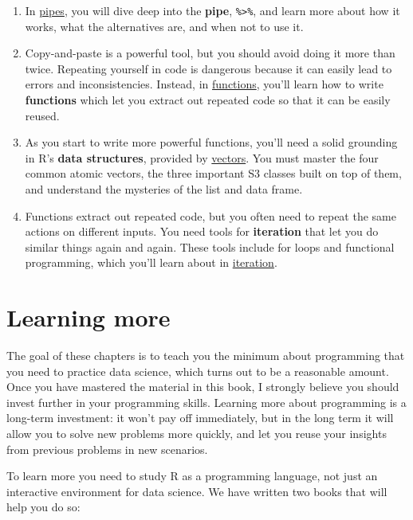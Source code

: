 \documentclass[]{book}
\begin{document}
\begin{enumerate}
\def\labelenumi{\arabic{enumi}.}
\item
  In \protect\hyperlink{pipes}{pipes}, you will dive deep into the
  \textbf{pipe}, \texttt{\%\textgreater{}\%}, and learn more about how
  it works, what the alternatives are, and when not to use it.
\item
  Copy-and-paste is a powerful tool, but you should avoid doing it more
  than twice. Repeating yourself in code is dangerous because it can
  easily lead to errors and inconsistencies. Instead, in
  \protect\hyperlink{functions}{functions}, you'll learn how to write
  \textbf{functions} which let you extract out repeated code so that it
  can be easily reused.
\item
  As you start to write more powerful functions, you'll need a solid
  grounding in R's \textbf{data structures}, provided by
  \protect\hyperlink{vectors}{vectors}. You must master the four common
  atomic vectors, the three important S3 classes built on top of them,
  and understand the mysteries of the list and data frame.
\item
  Functions extract out repeated code, but you often need to repeat the
  same actions on different inputs. You need tools for
  \textbf{iteration} that let you do similar things again and again.
  These tools include for loops and functional programming, which you'll
  learn about in \protect\hyperlink{iteration}{iteration}.
\end{enumerate}

\section{Learning more}\label{learning-more-1}

The goal of these chapters is to teach you the minimum about programming
that you need to practice data science, which turns out to be a
reasonable amount. Once you have mastered the material in this book, I
strongly believe you should invest further in your programming skills.
Learning more about programming is a long-term investment: it won't pay
off immediately, but in the long term it will allow you to solve new
problems more quickly, and let you reuse your insights from previous
problems in new scenarios.

To learn more you need to study R as a programming language, not just an
interactive environment for data science. We have written two books that
will help you do so:
\end{document}
